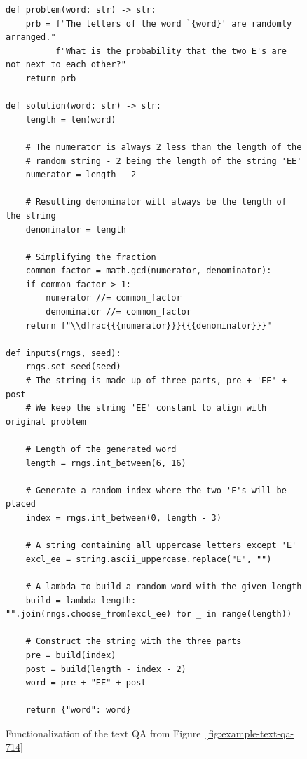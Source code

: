 \documentclass[11pt,a4paper]{article}
\begin{document}
\begin{figure}
\small
\begin{verbatim}
def problem(word: str) -> str:
    prb = f"The letters of the word `{word}' are randomly arranged."
          f"What is the probability that the two E's are not next to each other?"
    return prb

def solution(word: str) -> str:
    length = len(word)

    # The numerator is always 2 less than the length of the
    # random string - 2 being the length of the string 'EE'
    numerator = length - 2

    # Resulting denominator will always be the length of the string
    denominator = length

    # Simplifying the fraction
    common_factor = math.gcd(numerator, denominator):
    if common_factor > 1:
        numerator //= common_factor
        denominator //= common_factor
    return f"\\dfrac{{{numerator}}}{{{denominator}}}"

def inputs(rngs, seed):
    rngs.set_seed(seed)
    # The string is made up of three parts, pre + 'EE' + post
    # We keep the string 'EE' constant to align with original problem

    # Length of the generated word
    length = rngs.int_between(6, 16)

    # Generate a random index where the two 'E's will be placed
    index = rngs.int_between(0, length - 3)

    # A string containing all uppercase letters except 'E'
    excl_ee = string.ascii_uppercase.replace("E", "")

    # A lambda to build a random word with the given length
    build = lambda length: "".join(rngs.choose_from(excl_ee) for _ in range(length))

    # Construct the string with the three parts
    pre = build(index)
    post = build(length - index - 2)
    word = pre + "EE" + post

    return {"word": word}
\end{verbatim}
\caption{\label{fig:example-fn-qa-714} Functionalization of the text QA from Figure~\ref{fig:example-text-qa-714}}
\end{figure}
\end{document}
